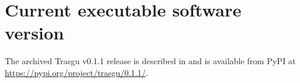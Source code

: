 \documentclass[preprint,12pt, a4paper]{elsarticle}
\begin{document}
\section*{Current executable software version}
\label{currentExecutableVersion}

The archived Trasgu v0.1.1 release is described in \cite{Trasgu011} and is
available from PyPI at
\url{https://pypi.org/project/trasgu/0.1.1/}.
\end{document}
